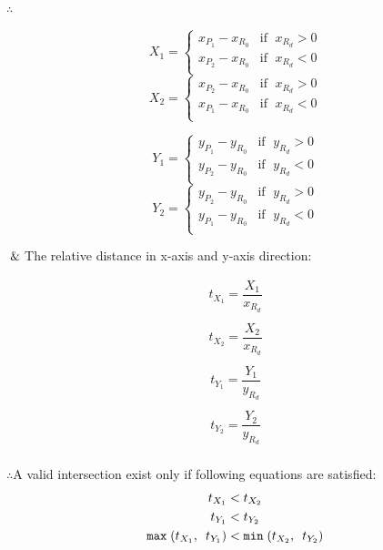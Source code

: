 $\therefore$

\begin{multicols}{2}
\noindent
	\[
	X_1 =
	\begin{cases}
	x_{P_1} - x_{R_0} & \text{if }\;x_{R_d} > 0\\
	x_{P_2} - x_{R_0} & \text{if }\;x_{R_d} < 0\\
	\end{cases}
	\]
\columnbreak
	\[
	X_2 =
	\begin{cases}
	x_{P_2} - x_{R_0} & \text{if }\;x_{R_d} > 0\\
	x_{P_1} - x_{R_0} & \text{if }\;x_{R_d} < 0\\
	\end{cases}
	\]
\end{multicols}

\begin{multicols}{2}
\noindent
	\[
	Y_1 =
	\begin{cases}
	y_{P_1} - y_{R_0} & \text{if }\;y_{R_d} > 0\\
	y_{P_2} - y_{R_0} & \text{if }\;y_{R_d} < 0\\
	\end{cases}
	\]
\columnbreak
	\[
	Y_2 =
	\begin{cases}
	y_{P_2} - y_{R_0} & \text{if }\;y_{R_d} > 0\\
	y_{P_1} - y_{R_0} & \text{if }\;y_{R_d} < 0\\
	\end{cases}
	\]
\end{multicols}

$\And$\;\;\;\;The relative distance in x-axis and y-axis direction:

\begin{multicols}{2}
\noindent
	\[
	\begin{array}{lr}
	t_{X_1} = \dfrac{X_1}{x_{R_d}}\\\\
	t_{X_2} = \dfrac{X_2}{x_{R_d}}\\
	\end{array}
	\]
\columnbreak
	\[
	\begin{array}{lr}
	t_{Y_1} = \dfrac{Y_1}{y_{R_d}}\\\\
	t_{Y_2} = \dfrac{Y_2}{y_{R_d}}\\
	\end{array}
	\]
\end{multicols}

$\therefore$\;\;\;\;A valid intersection exist only if following equations are satisfied:
\[
\begin{array}{lr}
\begin{aligned}
t_{X_1} &< t_{X_2}\\
t_{Y_1} &< t_{Y_2}\\
\texttt{max}\;(t_{X_1},\enspace t_{Y_1}) &< \texttt{min}\;(t_{X_2},\enspace t_{Y_2})
\end{aligned}
\end{array}
\]

